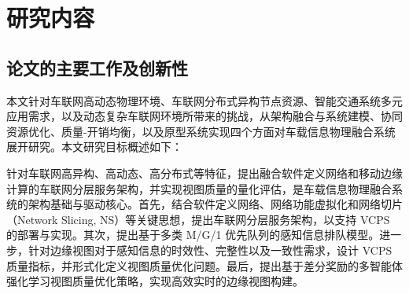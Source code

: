 
\section[\hspace{-2pt}研究内容]{{ \hspace{-8pt}研究内容}}\label{section 1-4}

\subsection[\hspace{-2pt}论文的主要工作及创新性]{{ \hspace{-8pt}论文的主要工作及创新性}}

本文针对车联网高动态物理环境、车联网分布式异构节点资源、智能交通系统多元应用需求，以及动态复杂车联网环境所带来的挑战，从架构融合与系统建模、协同资源优化、质量-开销均衡，以及原型系统实现四个方面对车载信息物理融合系统展开研究。本文研究目标概述如下：

 针对车联网高异构、高动态、高分布式等特征，提出融合软件定义网络和移动边缘计算的车联网分层服务架构，并实现视图质量的量化评估，是车载信息物理融合系统的架构基础与驱动核心。首先，结合软件定义网络、网络功能虚拟化和网络切片（Network Slicing, NS）等关键思想，提出车联网分层服务架构，以支持 VCPS 的部署与实现。其次，提出基于多类 M/G/1 优先队列的感知信息排队模型。进一步，针对边缘视图对于感知信息的时效性、完整性以及一致性需求，设计 VCPS 质量指标，并形式化定义视图质量优化问题。最后，提出基于差分奖励的多智能体强化学习视图质量优化策略，实现高效实时的边缘视图构建。

